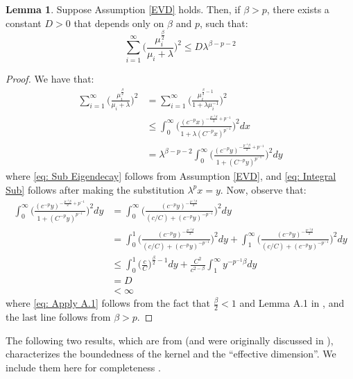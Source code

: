 \documentclass[accepted]{article}
\theoremstyle{definition}
\newtheorem{lemma}[theorem]{Lemma}
\begin{document}
\begin{lemma}
\label{Convergent Series}
Suppose Assumption \ref{EVD} holds. Then, if $\beta > p$, there exists a constant $D > 0$ that depends only on $\beta$ and $p$, such that:
\begin{equation*}
    \sum_{i = 1}^{\infty} \Big(\frac{\mu^{\frac{\beta}{2}}_i}{\mu_i + \lambda}\Big)^2 \leq D\lambda^{\beta - p - 2}
\end{equation*}
\end{lemma}
\begin{proof}
We have that:
\begin{align}
    \sum_{i = 1}^{\infty} \Big(\frac{\mu^{\frac{\beta}{2}}_i}{\mu_i + \lambda}\Big)^2 & = \sum_{i = 1}^{\infty} \Big(\frac{\mu^{\frac{\beta}{2} - 1}_i}{1 + \lambda \mu^{-1}_i}\Big)^2 \nonumber \\
    & \leq \int_{0}^{\infty} \Big(\frac{(c^{-p} x)^{-\frac{p^{-1}\beta}{2} + p^{-1}}}{1 + \lambda (C^{-p} x)^{p^{-1}}}\Big)^2 dx \label{eq: Sub Eigendecay} \\
    &  = \lambda^{\beta - p - 2} \int_{0}^{\infty} \Big(\frac{(c^{-p}y)^{-\frac{p^{-1}\beta}{2} + p^{-1}}}{1 + (C^{-p}y)^{p^{-1}}}\Big)^2 dy \label{eq: Integral Sub}
\end{align}
where \eqref{eq: Sub Eigendecay} follows from Assumption \ref{EVD}, and \eqref{eq: Integral Sub} follows after making the substitution $\lambda^{p}x = y$. Now, observe that:
\begin{align}
    \int_{0}^{\infty} \Big(\frac{(c^{-p} y)^{-\frac{p^{-1}\beta}{2} + p^{-1}}}{1 + (C^{-p} y)^{p^{-1}}}\Big)^2 dy  & = \int_{0}^{\infty} \Big(\frac{(c^{-p}y)^{-\frac{p^{-1}\beta}{2}}}{(c/C) + (c^{-p} y)^{-p^{-1}}}\Big)^2 dy \nonumber \\
    & = \int_{0}^{1} \Big(\frac{(c^{-p}y)^{-\frac{p^{-1}\beta}{2}}}{(c/C) + (c^{-p} y)^{-p^{-1}}}\Big)^2 dy + \int_{1}^{\infty} \Big(\frac{(c^{-p}y)^{-\frac{p^{-1}\beta}{2}}}{(c/C) + (c^{-p} y)^{-p^{-1}}}\Big)^2 dy \nonumber \\
    & \leq \int_{0}^{1} \Big(\frac{c}{C}\Big)^{\frac{\beta}{2} - 1} dy + \frac{C^2}{c^{2 - \beta}} \int_{1}^{\infty} y^{-p^{-1}\beta} dy \label{eq: Apply A.1} \\
    & = D \nonumber \\
    & < \infty
\end{align}
where \eqref{eq: Apply A.1} follows from the fact that $\frac{\beta}{2} < 1$ and Lemma A.1 in \cite{fischer2020sobolev}, and the last line follows from $\beta > p$. 
\end{proof}
The following two results, which are from \cite{fischer2020sobolev} (and were originally discussed in \cite{steinwart2012mercer}), characterizes the boundedness of the kernel and the ``effective dimension''. We include them here for completeness . 
\end{document}
